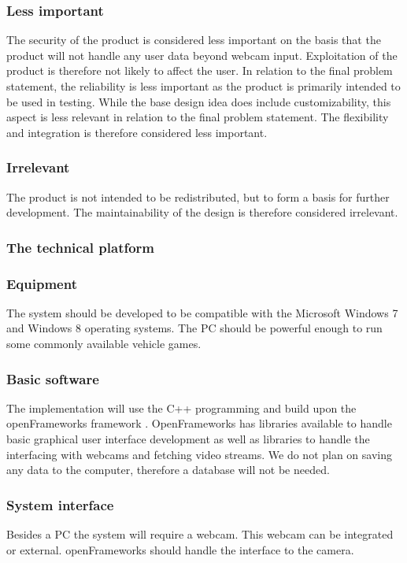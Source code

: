 \subsubsection*{Less important}
The security of the product is considered less important on the basis that the product will not handle any user data beyond webcam input. Exploitation of the product is therefore not likely to affect the user. In relation to the final problem statement, the reliability is less important as the product is primarily intended to be used in testing. While the base design idea does include customizability, this aspect is less relevant in relation to the final problem statement. The flexibility and integration is therefore considered less important. 

\subsubsection*{Irrelevant}
The product is not intended to be redistributed, but to form a basis for further development. The maintainability of the design is therefore considered irrelevant.

\subsubsection{The technical platform}
\subsubsection*{Equipment}
The system should be developed to be compatible with the Microsoft Windows 7 and Windows 8 operating systems. The PC should be powerful enough to run some commonly available vehicle games. 

\subsubsection*{Basic software}
The implementation will use the C++ programming and build upon the openFrameworks framework \parencite{Openframeworks2013}. OpenFrameworks has libraries available to handle basic graphical user interface development as well as libraries to handle the interfacing with webcams and fetching video streams. We do not plan on saving any data to the computer, therefore a database will not be needed.

\subsubsection*{System interface}
Besides a PC the system will require a webcam. This webcam can be integrated or external. openFrameworks should handle the interface to the camera.

